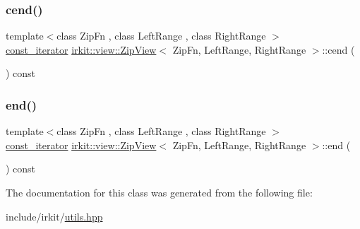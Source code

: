 \mbox{\label{classirkit_1_1view_1_1ZipView_a5ba1f0456da3ffc049e59418b4a01a3f}} 
\subsubsection{\texorpdfstring{cend()}{cend()}}
{\footnotesize\ttfamily template$<$class Zip\+Fn , class Left\+Range , class Right\+Range $>$ \\
\mbox{\hyperlink{classirkit_1_1view_1_1ZipView_1_1const__iterator}{const\+\_\+iterator}} \mbox{\hyperlink{classirkit_1_1view_1_1ZipView}{irkit\+::view\+::\+Zip\+View}}$<$ Zip\+Fn, Left\+Range, Right\+Range $>$\+::cend (\begin{DoxyParamCaption}{ }\end{DoxyParamCaption}) const\hspace{0.3cm}{\ttfamily [inline]}}

\mbox{\label{classirkit_1_1view_1_1ZipView_ab8a193bad7c33b93367014f32e9cf360}} 
\subsubsection{\texorpdfstring{end()}{end()}}
{\footnotesize\ttfamily template$<$class Zip\+Fn , class Left\+Range , class Right\+Range $>$ \\
\mbox{\hyperlink{classirkit_1_1view_1_1ZipView_1_1const__iterator}{const\+\_\+iterator}} \mbox{\hyperlink{classirkit_1_1view_1_1ZipView}{irkit\+::view\+::\+Zip\+View}}$<$ Zip\+Fn, Left\+Range, Right\+Range $>$\+::end (\begin{DoxyParamCaption}{ }\end{DoxyParamCaption}) const\hspace{0.3cm}{\ttfamily [inline]}}



The documentation for this class was generated from the following file\+:\begin{DoxyCompactItemize}
\item 
include/irkit/\mbox{\hyperlink{utils_8hpp}{utils.\+hpp}}\end{DoxyCompactItemize}
